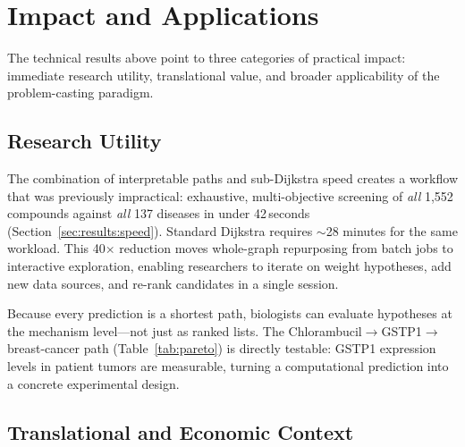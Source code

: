 \documentclass[11pt,a4paper]{article}
\begin{document}
\section{Impact and Applications}
\label{sec:impact}


The technical results above point to three categories of practical
impact: immediate research utility, translational value, and
broader applicability of the problem-casting paradigm.

\subsection{Research Utility}
\label{sec:impact:research}

The combination of interpretable paths and sub-Dijkstra speed
creates a workflow that was previously impractical: exhaustive,
multi-objective screening of \emph{all} 1,552 compounds against
\emph{all} 137 diseases in under 42\,seconds (Section~\ref{sec:results:speed}).
Standard Dijkstra requires $\sim$28 minutes for the same workload.
This 40$\times$ reduction moves whole-graph repurposing from batch
jobs to interactive exploration, enabling researchers to iterate on
weight hypotheses, add new data sources, and re-rank candidates in
a single session.

Because every prediction is a shortest path, biologists can evaluate
hypotheses at the mechanism level---not just as ranked lists.  The
Chlorambucil$\to$GSTP1$\to$breast-cancer path
(Table~\ref{tab:pareto}) is directly testable: GSTP1 expression
levels in patient tumors are measurable, turning a computational
prediction into a concrete experimental design.

\subsection{Translational and Economic Context}
\label{sec:impact:translational}
\end{document}
